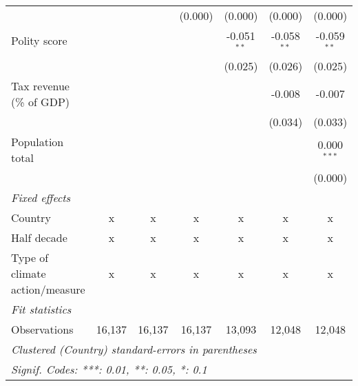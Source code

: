 \begin{tabular}{lcccccc}
                                                                            &               &               & (0.000)        & (0.000)       & (0.000)       & (0.000)\\   
   Polity score                                                             &               &               &                & -0.051$^{**}$ & -0.058$^{**}$ & -0.059$^{**}$\\   
                                                                            &               &               &                & (0.025)       & (0.026)       & (0.025)\\   
   Tax revenue (\% of GDP)                                                  &               &               &                &               & -0.008        & -0.007\\   
                                                                            &               &               &                &               & (0.034)       & (0.033)\\   
   Population total                                                         &               &               &                &               &               & 0.000$^{***}$\\   
                                                                            &               &               &                &               &               & (0.000)\\   
   \emph{Fixed effects}\\
   Country                                                                  & x             & x             & x              & x             & x             & x\\  
   Half decade                                                              & x             & x             & x              & x             & x             & x\\  
   Type of climate action/measure                                           & x             & x             & x              & x             & x             & x\\  
   \midrule \emph{Fit statistics}\\
   Observations                                                             & 16,137        & 16,137        & 16,137         & 13,093        & 12,048        & 12,048\\  
   \midrule
   \multicolumn{7}{l}{\emph{Clustered (Country) standard-errors in parentheses}}\\
   \multicolumn{7}{l}{\emph{Signif. Codes: ***: 0.01, **: 0.05, *: 0.1}}\\
\end{tabular}
\par\endgroup


